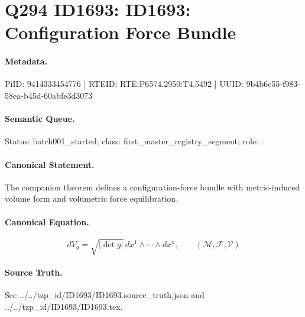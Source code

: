 \section*{Q294 ID1693: ID1693: Configuration Force Bundle}
\paragraph{Metadata.}
PiID: 9414333454776 | RTEID: RTE:P6574.2950:T4.5492 | UUID: 9b4b6c55-f983-58ea-b45d-60abfe3d3073

\paragraph{Semantic Queue.}
Status: batch001\_started; class: first\_master\_registry\_segment; role: .

\paragraph{Canonical Statement.}
The companion theorem defines a configuration-force bundle with metric-induced volume form and volumetric force equilibration.

\paragraph{Canonical Equation.}
\[
dV_g=\sqrt{|\det g|}\,dx^1\wedge\cdots\wedge dx^n,\qquad(\mathcal{M},\mathcal{F},\mathcal{V})
\]

\paragraph{Source Truth.}
See ../../tzp\_id/ID1693/ID1693.source\_truth.json and ../../tzp\_id/ID1693/ID1693.tex.

